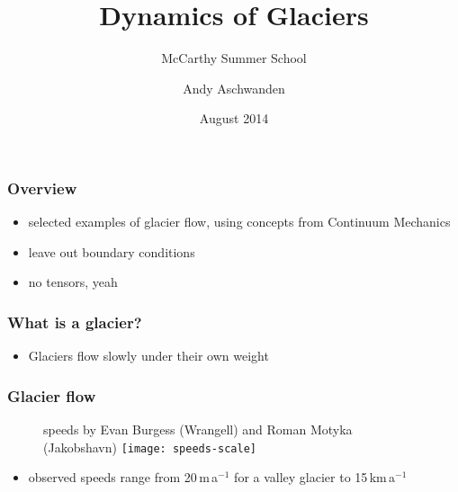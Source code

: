 \documentclass[hide notes,intlimits,unknownkeysallowed]{beamer}
\title[Glacier Dynamics] %
{Dynamics of Glaciers}
\subtitle{McCarthy Summer School}
\author[Aschwanden] %
{Andy Aschwanden}
\institute[GI] %
{
  Geophysical Institute\\
  University of Alaska Fairbanks, USA
}
\date{August 2014}
\begin{document}


  {
} 

\begin{frame}
  \titlepage
\end{frame}

{
%
} 

\begin{frame}
  \frametitle{Overview}
    \begin{itemize}
    \item \alert{selected} examples of glacier flow, using concepts from
      Continuum Mechanics
    \item leave out boundary conditions
    \item no tensors, yeah
    \end{itemize}
\end{frame}

\begin{frame}
  \frametitle{What is a glacier?}
  \begin{itemize}
  \item Glaciers flow slowly under their own weight
  \end{itemize}
\end{frame}

\begin{frame}
  \frametitle{Glacier flow}
  \begin{figure}
    \scriptsize{speeds by Evan Burgess (Wrangell) and Roman Motyka (Jakobshavn)}
    \texttt{[image: speeds-scale]}
  \end{figure}
  \begin{itemize}
    \item observed speeds range from 20\,m\,a$^{-1}$ for a valley glacier to 15\,km\,a$^{-1}$
  \end{itemize}
  \note[itemize]{
}
\end{frame}
\end{document}
